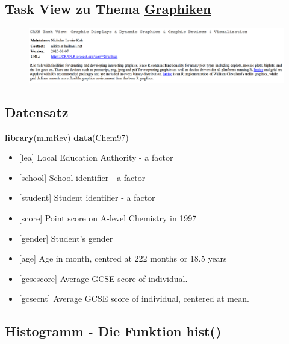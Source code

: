 \documentclass[]{article}
\newenvironment{Shaded}{\begin{snugshade}}{\end{snugshade}}
\newcommand{\KeywordTok}[1]{\textcolor[rgb]{0.13,0.29,0.53}{\textbf{{#1}}}}
\newcommand{\NormalTok}[1]{{#1}}
\providecommand{\tightlist}{%
  \setlength{\itemsep}{0pt}\setlength{\parskip}{0pt}}
\begin{document}
\subsection{\texorpdfstring{Task View zu Thema
\href{https://cran.r-project.org/web/views/Graphics.html}{Graphiken}}{Task View zu Thema Graphiken}}\label{task-view-zu-thema-graphiken}

\begin{figure}[htbp]
\centering
\includegraphics{figure/TaskViewGraphics.PNG}
\caption{}
\end{figure}

\subsection{Datensatz}\label{datensatz}

\begin{Shaded}
\begin{Highlighting}[]
\KeywordTok{library}\NormalTok{(mlmRev)}
\KeywordTok{data}\NormalTok{(Chem97)}
\end{Highlighting}
\end{Shaded}

\begin{itemize}
\tightlist
\item
  {[}lea{]} Local Education Authority - a factor
\item
  {[}school{]} School identifier - a factor
\item
  {[}student{]} Student identifier - a factor
\item
  {[}score{]} Point score on A-level Chemistry in 1997
\item
  {[}gender{]} Student's gender
\item
  {[}age{]} Age in month, centred at 222 months or 18.5 years
\item
  {[}gcsescore{]} Average GCSE score of individual.
\item
  {[}gcsecnt{]} Average GCSE score of individual, centered at mean.
\end{itemize}

\subsection{Histogramm - Die Funktion
hist()}\label{histogramm---die-funktion-hist}
\end{document}
